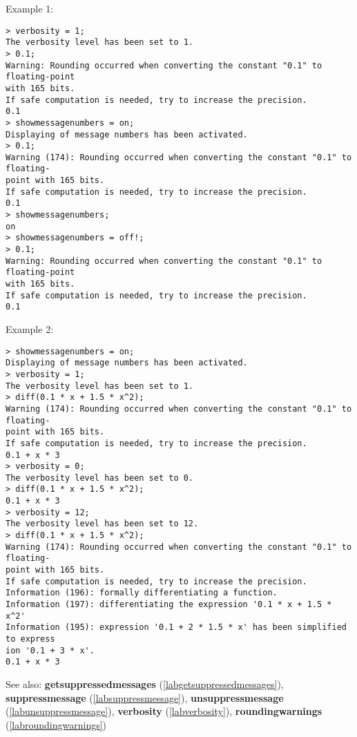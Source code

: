 \noindent Example 1: 
\begin{center}\begin{minipage}{15cm}\begin{Verbatim}[frame=single,commandchars=\\\|\~]
> verbosity = 1;
The verbosity level has been set to 1.
> 0.1;
Warning: Rounding occurred when converting the constant "0.1" to floating-point 
with 165 bits.
If safe computation is needed, try to increase the precision.
0.1
> showmessagenumbers = on;
Displaying of message numbers has been activated.
> 0.1;
Warning (174): Rounding occurred when converting the constant "0.1" to floating-
point with 165 bits.
If safe computation is needed, try to increase the precision.
0.1
> showmessagenumbers;
on
> showmessagenumbers = off!;
> 0.1;
Warning: Rounding occurred when converting the constant "0.1" to floating-point 
with 165 bits.
If safe computation is needed, try to increase the precision.
0.1
\end{Verbatim}
\end{minipage}\end{center}
\noindent Example 2: 
\begin{center}\begin{minipage}{15cm}\begin{Verbatim}[frame=single,commandchars=\\\|\~]
> showmessagenumbers = on;
Displaying of message numbers has been activated.
> verbosity = 1;
The verbosity level has been set to 1.
> diff(0.1 * x + 1.5 * x^2);
Warning (174): Rounding occurred when converting the constant "0.1" to floating-
point with 165 bits.
If safe computation is needed, try to increase the precision.
0.1 + x * 3
> verbosity = 0;
The verbosity level has been set to 0.
> diff(0.1 * x + 1.5 * x^2);
0.1 + x * 3
> verbosity = 12;
The verbosity level has been set to 12.
> diff(0.1 * x + 1.5 * x^2);
Warning (174): Rounding occurred when converting the constant "0.1" to floating-
point with 165 bits.
If safe computation is needed, try to increase the precision.
Information (196): formally differentiating a function.
Information (197): differentiating the expression '0.1 * x + 1.5 * x^2'
Information (195): expression '0.1 + 2 * 1.5 * x' has been simplified to express
ion '0.1 + 3 * x'.
0.1 + x * 3
\end{Verbatim}
\end{minipage}\end{center}
See also: \textbf{getsuppressedmessages} (\ref{labgetsuppressedmessages}), \textbf{suppressmessage} (\ref{labsuppressmessage}), \textbf{unsuppressmessage} (\ref{labunsuppressmessage}), \textbf{verbosity} (\ref{labverbosity}), \textbf{roundingwarnings} (\ref{labroundingwarnings})
